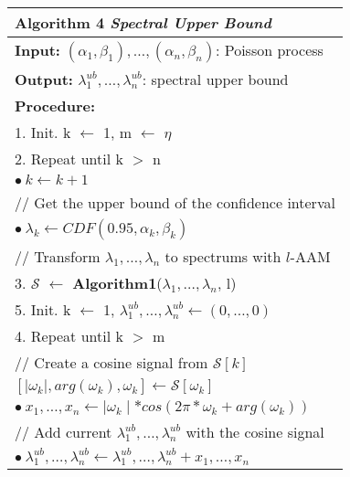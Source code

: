 \begin{figure}[t!]
	\begin{center}
		\begin{tabular*}{0.5\textwidth}{l @{\extracolsep{\fill}}}
			\hline
			\textbf{Algorithm 4} \textit{Spectral Upper Bound} \\
			\hline
			\textbf{Input:} $(\alpha_1, \beta_1), \ldots, (\alpha_n, \beta_n)$: Poisson process \\
			\textbf{Output:} $\lambda^{ub}_1, \ldots, \lambda^{ub}_n$: spectral upper bound \\
			\textbf{Procedure:}\\
			\hspace{0.3cm} 1. Init. k $\leftarrow$ 1, m $\leftarrow$ $\eta$ \\
			\hspace{0.3cm} 2. Repeat until k $>$ n \\
			\hspace{0.7cm} $\bullet ~ k \leftarrow k + 1$ \\
			\hspace{0.7cm} // Get the upper bound of the confidence interval \\
			\hspace{0.7cm} $\bullet ~ \lambda_k \leftarrow CDF(0.95, \alpha_k, \beta_k)$ \\
			\hspace{0.3cm} // Transform $\lambda_1, \ldots, \lambda_n$ to spectrums with $l$-AAM \\
			\hspace{0.3cm} 3. $\mathcal S$ $\leftarrow$ \textbf{Algorithm1}($\lambda_1, \ldots, \lambda_n$, l) \\
			\hspace{0.3cm} 5. Init. k $\leftarrow$ 1,  $\lambda^{ub}_1, \ldots, \lambda^{ub}_n \leftarrow (0, \ldots, 0)$ \\
			\hspace{0.3cm} 4. Repeat until k $>$ m \\
			\hspace{0.7cm} // Create a cosine signal from $\mathcal S[k]$ \\
			\hspace{0.7cm} $[\mid \omega_k \mid, arg(\omega_k), \omega_k] \leftarrow \mathcal S[\omega_k]$ \\
			\hspace{0.7cm} $\bullet ~ x_1, \ldots, x_n \leftarrow \mid \omega_k \mid * cos(2 \pi * \omega_k + arg(\omega_k))$ \\
			\hspace{0.7cm} // Add current $\lambda^{ub}_1, \ldots, \lambda^{ub}_n$ with the cosine signal \\
			\hspace{0.7cm} $\bullet ~ \lambda^{ub}_1, \ldots, \lambda^{ub}_n \leftarrow \lambda^{ub}_1, \ldots, \lambda^{ub}_n + x_1, \ldots, x_n$ \\
			\hline
		\end{tabular*}	
	\end{center}
\end{figure} 

